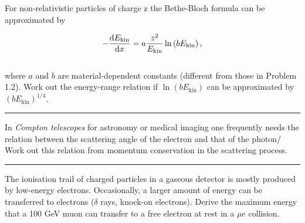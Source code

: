
\begin{problem}{1.4}
For non-relativistic particles of charge z the Bethe-Bloch formula can be approximated by

\begin{align*}
    - \frac{\mathop{}\!\mathrm{d} E_{\text{kin}}}{\mathop{}\!\mathrm{d} x} = a \frac{z^2}{E_{\text{kin}}} \ln\left(bE_{\text{kin}}\right),
\end{align*}\\
where $a$ and $b$ are material-dependent constants (different from those in Problem 1.2). Work out the energy-range relation if $ \ln\left(bE_{\text{kin}}\right)$ can be approximated by $\left(bE_{\text{kin}}\right)^{1/4}$.
\end{problem}
\begin{solution}

\end{solution}

\noindent\rule{7in}{1.5pt}


\begin{problem}{1.5}
In \textit{Compton telescopes} for astronomy or medical imaging one frequently needs the relation between the scattering angle of the electron and that of the photon/ Work out this relation from momentum conservation in the scattering process.
\end{problem}
\begin{solution}

\end{solution}

\noindent\rule{7in}{1.5pt}


\begin{problem}{1.6}
The ionisation trail of charged particles in a gaseous detector is mostly produced by low-energy electrons. Occasionally, a larger amount of energy can be transferred to electrons ($\delta$ rays, knock-on electrons). Derive the maximum energy that a 100 GeV muon can transfer to a free electron at rest in a $\mu e$ collision.
\end{problem}
\begin{solution}

\end{solution}

